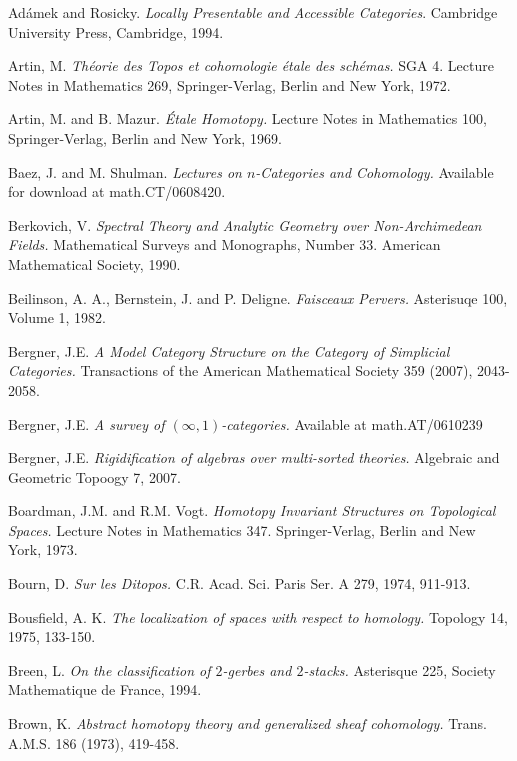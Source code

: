 \documentclass{report}[10pt, final]
\theoremstyle{definition}
\begin{document}
\begin{thebibliography}{99}


 Ad\'{a}mek and Rosicky. {\it Locally Presentable
and Accessible Categories}. Cambridge University Press, Cambridge,
1994.

 Artin, M. {\it Th\'{e}orie des Topos et cohomologie
\'{e}tale des sch\'{e}mas.} SGA 4. Lecture Notes in Mathematics
269, Springer-Verlag, Berlin and New York, 1972.

 Artin, M. and B. Mazur. {\it \'{E}tale Homotopy.} Lecture Notes in Mathematics 100, Springer-Verlag, Berlin and New York, 1969.

 Baez, J. and M. Shulman. {\it Lectures on $n$-Categories and Cohomology.} Available for download at math.CT/0608420.

 Berkovich, V. {\it Spectral Theory and Analytic Geometry over Non-Archimedean Fields.} Mathematical Surveys and Monographs, Number 33. American Mathematical Society, 1990.

 Beilinson, A. A., Bernstein, J. and P. Deligne.
{\it Faisceaux Pervers.} Asterisuqe 100, Volume 1, 1982.

 Bergner, J.E. {\it A Model Category Structure on the Category of Simplicial Categories.} Transactions of the American Mathematical Society 359 (2007), 2043-2058.

 Bergner, J.E. {\it A survey of $(\infty,1)$-categories.} Available at math.AT/0610239

 Bergner, J.E. {\it Rigidification of algebras over multi-sorted theories.}
Algebraic and Geometric Topoogy 7, 2007.

 Boardman, J.M. and R.M. Vogt. {\it Homotopy
Invariant Structures on Topological Spaces.} Lecture Notes in
Mathematics 347. Springer-Verlag, Berlin and New York, 1973.

 Bourn, D. {\it Sur les Ditopos.} C.R. Acad.
Sci. Paris Ser. A 279, 1974, 911-913.

 Bousfield, A. K. {\it The localization of spaces
with respect to homology.} Topology 14, 1975, 133-150.

 Breen, L. {\it On the classification of $2$-gerbes and $2$-stacks.} Asterisque 225, Society Mathematique de France, 1994.

 Brown, K. {\it Abstract homotopy theory and generalized sheaf cohomology.} Trans. 
A.M.S. 186 (1973), 419-458. 


\end{thebibliography}
\end{document}
